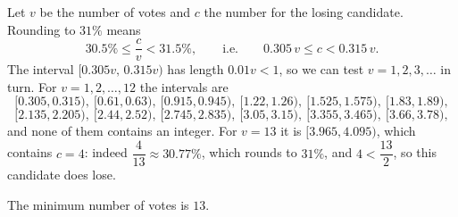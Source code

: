 Let $v$ be the number of votes and $c$ the number for the losing candidate. Rounding to $31\%$ means
\[30.5\%\le\dfrac cv<31.5\%,\qquad\text{i.e.}\qquad 0.305\,v\le c<0.315\,v.\]
The interval $[0.305v,\,0.315v)$ has length $0.01v<1$, so we can test $v=1,2,3,\dots$ in turn. For $v=1,2,\dots,12$ the intervals are
\[[0.305,0.315),\ [0.61,0.63),\ [0.915,0.945),\ [1.22,1.26),\ [1.525,1.575),\ [1.83,1.89),\]
\[[2.135,2.205),\ [2.44,2.52),\ [2.745,2.835),\ [3.05,3.15),\ [3.355,3.465),\ [3.66,3.78),\]
and none of them contains an integer. For $v=13$ it is $[3.965,4.095)$, which contains $c=4$: indeed $\dfrac4{13}\approx30.77\%$, which rounds to $31\%$, and $4<\dfrac{13}{2}$, so this candidate does lose.

The minimum number of votes is $\boxed{13}$.
